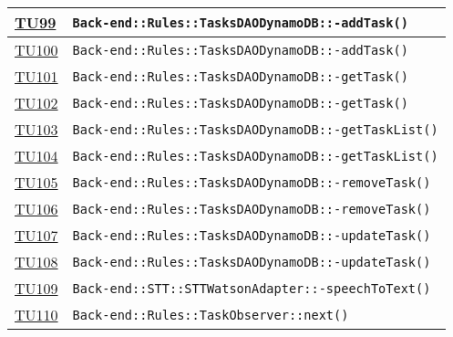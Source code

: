 \begin{longtable}{|>{\centering}m{1cm}|m{12cm}<{\centering}|}
\hyperlink{TU99}{TU99} & \texttt{Back-end::Rules::TasksDAODynamoDB::-\linebreak addTask()}\\ \hline

\hyperlink{TU100}{TU100} & \texttt{Back-end::Rules::TasksDAODynamoDB::-\linebreak addTask()}\\ \hline

\hyperlink{TU101}{TU101} & \texttt{Back-end::Rules::TasksDAODynamoDB::-\linebreak getTask()}\\ \hline

\hyperlink{TU102}{TU102} & \texttt{Back-end::Rules::TasksDAODynamoDB::-\linebreak getTask()}\\ \hline

\hyperlink{TU103}{TU103} & \texttt{Back-end::Rules::TasksDAODynamoDB::-\linebreak getTaskList()}\\ \hline

\hyperlink{TU104}{TU104} & \texttt{Back-end::Rules::TasksDAODynamoDB::-\linebreak getTaskList()}\\ \hline

\hyperlink{TU105}{TU105} & \texttt{Back-end::Rules::TasksDAODynamoDB::-\linebreak removeTask()}\\ \hline

\hyperlink{TU106}{TU106} & \texttt{Back-end::Rules::TasksDAODynamoDB::-\linebreak removeTask()}\\ \hline

\hyperlink{TU107}{TU107} & \texttt{Back-end::Rules::TasksDAODynamoDB::-\linebreak updateTask()}\\ \hline

\hyperlink{TU108}{TU108} & \texttt{Back-end::Rules::TasksDAODynamoDB::-\linebreak updateTask()}\\ \hline

\hyperlink{TU109}{TU109} & \texttt{Back-end::STT::STTWatsonAdapter::-\linebreak speechToText()}\\ \hline

\hyperlink{TU110}{TU110} & \texttt{Back-end::Rules::TaskObserver::next()}\\ \hline


\end{longtable}
